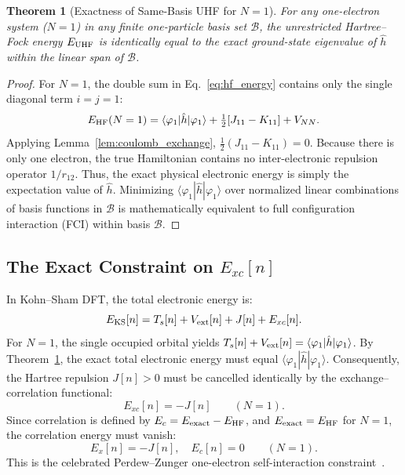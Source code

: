 \documentclass[journal]{IEEEtran}
\newtheorem{theorem}{Theorem}
\begin{document}
\begin{theorem}[Exactness of Same-Basis UHF for $N=1$]
\label{thm:hf_exact}
For any one-electron system ($N=1$) in any finite one-particle basis set $\mathcal{B}$, the unrestricted Hartree--Fock energy $E_{\rm UHF}$ is identically equal to the exact ground-state eigenvalue of $\hat h$ within the linear span of $\mathcal{B}$.
\end{theorem}
\begin{proof}
For $N=1$, the double sum in Eq.~\eqref{eq:hf_energy} contains only the single diagonal term $i=j=1$:
\begin{equation}
E_{\rm HF}(N=1) = \langle \varphi_1 | \hat h | \varphi_1 \rangle + \tfrac12 [ J_{11} - K_{11} ] + V_{NN}.
\end{equation}
Applying Lemma~\ref{lem:coulomb_exchange}, $\tfrac12 (J_{11} - K_{11}) = 0$. Because there is only one electron, the true Hamiltonian contains no inter-electronic repulsion operator $1/r_{12}$. Thus, the exact physical electronic energy is simply the expectation value of $\hat h$. Minimizing $\langle \varphi_1 | \hat h | \varphi_1 \rangle$ over normalized linear combinations of basis functions in $\mathcal{B}$ is mathematically equivalent to full configuration interaction (FCI) within basis $\mathcal{B}$.
\end{proof}

\subsection{The Exact Constraint on $E_{xc}[n]$}
In Kohn--Sham DFT, the total electronic energy is:
\begin{equation}
E_{\rm KS}[n] = T_s[n] + V_{\rm ext}[n] + J[n] + E_{xc}[n].
\end{equation}
For $N=1$, the single occupied orbital yields $T_s[n] + V_{\rm ext}[n] = \langle \varphi_1 | \hat h | \varphi_1 \rangle$. By Theorem~\ref{thm:hf_exact}, the exact total electronic energy must equal $\langle \varphi_1 | \hat h | \varphi_1 \rangle$. Consequently, the Hartree repulsion $J[n] > 0$ must be cancelled identically by the exchange--correlation functional:
\begin{equation}
E_{xc}[n] = -J[n] \qquad (N=1).
\label{eq:sic_constraint}
\end{equation}
Since correlation is defined by $E_c = E_{\rm exact} - E_{\rm HF}$, and $E_{\rm exact} = E_{\rm HF}$ for $N=1$, the correlation energy must vanish:
\begin{equation}
\boxed{E_x[n] = -J[n], \quad E_c[n] = 0 \qquad (N=1).}
\label{eq:pz_constraint}
\end{equation}
This is the celebrated Perdew--Zunger one-electron self-interaction constraint~\cite{PZ1981}.
\end{document}
